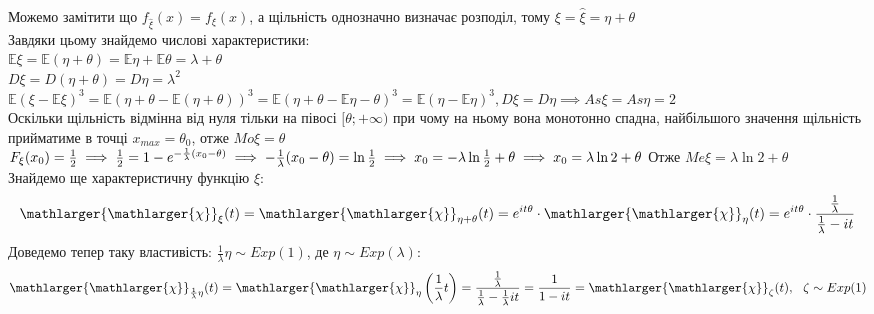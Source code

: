 \documentclass[11 pt]{article}
\begin{document}
Можемо замітити що $f_{\widehat{\xi}}(x) = f_{\xi}(x)$, а щільність однозначно
визначає розподіл, тому $\xi = \widehat{\xi} = \eta + \theta$ 
\\
Завдяки цьому знайдемо числові характеристики: \\ 
$
\mathbb{E}\xi = \mathbb{E} (\eta + \theta) = \mathbb{E} \eta + \mathbb{E} \theta =
\lambda + \theta
$ \\ 
$
D \xi = D (\eta + \theta) = D \eta  = \lambda^2
$ \\ 
$
\mathbb{E} (\xi - \mathbb{E} \xi)^3 = \mathbb{E} (\eta + \theta - \mathbb{E} (\eta + \theta))^3 = 
\mathbb{E} (\eta + \theta - \mathbb{E} \eta - \theta)^3 =
\mathbb{E} (\eta - \mathbb{E} \eta)^3, D \xi = D \eta \implies As \xi = As \eta = 2
$
\\ 
Оскільки щільність відмінна від нуля тільки на півосі $[\theta; +\infty)$
при чому на ньому вона монотонно спадна, найбільшого значення щільність прийматиме
в точці $x_{max} = \theta_0 $, отже $Mo \xi = \theta$   \\ 
$
F_{\xi}(x_0) = \frac{1}{2} \implies 
\frac{1}{2} = 1-e^{-\frac{1}{\lambda}(x_0 -\theta)} \implies
-\frac{1}{\lambda}(x_0 - \theta) = \ln{\frac{1}{2}} \implies
x_0 = -\lambda \ln{\frac{1}{2}} + \theta \implies
x_0 = \lambda \ln{2} + \theta \\
$ 
Отже $Me \xi = \lambda \ln{2} + \theta$ \\
Знайдемо ще характеристичну функцію $\xi$:
$$ 
\mathlarger{\mathlarger{\chi}}_\xi(t)=
\mathlarger{\mathlarger{\chi}}_{\eta + \theta}(t) = 
e^{it \theta} \cdot \mathlarger{\mathlarger{\chi}}_\eta(t)
=e^{it \theta} \cdot \frac{\frac{1}{\lambda}}{\frac{1}{\lambda}-it}
$$
Доведемо тепер таку властивість: $\frac{1}{\lambda} \eta \sim Exp(1)$, де 
$\eta \sim Exp(\lambda)$:
$$  
\mathlarger{\mathlarger{\chi}}_{\frac{1}{\lambda}\eta}(t)= 
\mathlarger{\mathlarger{\chi}}_{\eta}\left(\frac{1}{\lambda}t\right)=
\frac{\frac{1}{\lambda}}{\frac{1}{\lambda}-\frac{1}{\lambda}it}=
\frac{1}{1-it}=
\mathlarger{\mathlarger{\chi}}_{\zeta}(t), \ \ \zeta \sim Exp(1)
$$ 
\end{document}

